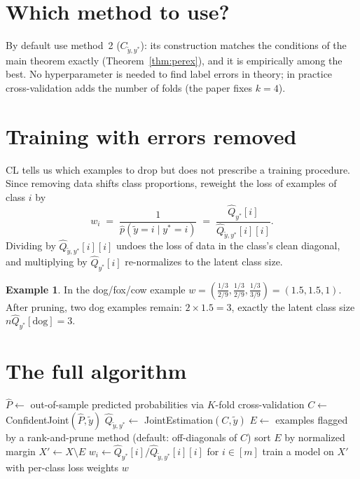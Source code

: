 \documentclass[11pt,a4paper]{report}
\newcommand{\Cyy}{C_{\tilde y,y^*}}
\newcommand{\1}{\mathbf 1}
\theoremstyle{definition}
\newtheorem{example}[definition]{Example}
\theoremstyle{plain}
\theoremstyle{remark}
\begin{document}
\section{Which method to use?}
By default use method~2 ($\Cyy$): its construction matches the conditions of the main theorem exactly (Theorem~\ref{thm:perex}), and it is empirically among the best. No hyperparameter is needed to find label errors in theory; in practice cross-validation adds the number of folds (the paper fixes $k=4$).

\section{Training with errors removed}
CL tells us which examples to drop but does not prescribe a training procedure. Since removing data shifts class proportions, reweight the loss of examples of class $i$ by
\begin{equation}\label{eq:weight}
w_i \;=\; \frac{1}{\hat p(\tilde y=i\mid y^*=i)} \;=\; \frac{\hat Q_{y^*}[i]}{\hat Q_{\tilde y,y^*}[i][i]}.
\end{equation}
Dividing by $\hat Q_{\tilde y,y^*}[i][i]$ undoes the loss of data in the class's clean diagonal, and multiplying by $\hat Q_{y^*}[i]$ re-normalizes to the latent class size.

\begin{example}
In the dog/fox/cow example $w=(\tfrac{1/3}{2/9},\tfrac{1/3}{2/9},\tfrac{1/3}{3/9})=(1.5,1.5,1)$. After pruning, two dog examples remain: $2\times1.5=3$, exactly the latent class size $n\hat Q_{y^*}[\text{dog}]=3$.
\end{example}

\section{The full algorithm}
\begin{algorithm}[H]
\caption{Confident Learning (end to end)}\label{alg:cl}
$\hat P\leftarrow$ out-of-sample predicted probabilities via $K$-fold cross-validation\;
$C\leftarrow$ ConfidentJoint$(\hat P,\tilde y)$ 
$\hat Q_{\tilde y,y^*}\leftarrow$ JointEstimation$(C,\tilde y)$ 
$E\leftarrow$ examples flagged by a rank-and-prune method (default: off-diagonals of $C$)\;
sort $E$ by normalized margin\;
$X'\leftarrow X\setminus E$\;
$w_i\leftarrow \hat Q_{y^*}[i]/\hat Q_{\tilde y,y^*}[i][i]$ for $i\in[m]$\;
train a model on $X'$ with per-class loss weights $w$\;
\end{algorithm}
\end{document}
